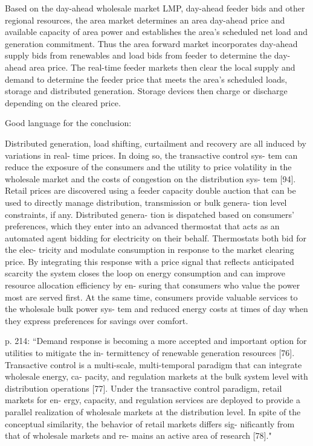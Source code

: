 Based on the day-ahead wholesale market LMP, day-ahead feeder bids and other regional resources, the area market determines an area day-ahead price and available capacity of area power and establishes the area's scheduled net load and generation commitment. Thus the area forward market incorporates day-ahead supply bids from renewables and load bids from feeder to determine the day-ahead area price. The real-time feeder markets then clear the local supply and demand to determine the feeder price that meets the area's scheduled loads, storage and distributed generation. Storage devices then charge or discharge depending on the cleared price.




Good language for the conclusion:

Distributed generation, load shifting, curtailment
and recovery are all induced by variations in real-
time prices. In doing so, the transactive control sys-
tem can reduce the exposure of the consumers and
the utility to price volatility in the wholesale market
and the costs of congestion on the distribution sys-
tem [94]. Retail prices are discovered using a feeder
capacity double auction that can be used to directly
manage distribution, transmission or bulk genera-
tion level constraints, if any. Distributed genera-
tion is dispatched based on consumers' preferences,
which they enter into an advanced thermostat that
acts as an automated agent bidding for electricity
on their behalf. Thermostats both bid for the elec-
tricity and modulate consumption in response to the
market clearing price. By integrating this response
with a price signal that reflects anticipated scarcity
the system closes the loop on energy consumption
and can improve resource allocation efficiency by en-
suring that consumers who value the power most are
served first. At the same time, consumers provide
valuable services to the wholesale bulk power sys-
tem and reduced energy costs at times of day when
they express preferences for savings over comfort.

p. 214: ``Demand response is becoming a more accepted
and important option for utilities to mitigate the in-
termittency of renewable generation resources [76].
Transactive control is a multi-scale, multi-temporal
paradigm that can integrate wholesale energy, ca-
pacity, and regulation markets at the bulk system
level with distribution operations [77]. Under the
transactive control paradigm, retail markets for en-
ergy, capacity, and regulation services are deployed
to provide a parallel realization of wholesale markets
at the distribution level. In spite of the conceptual
similarity, the behavior of retail markets differs sig-
nificantly from that of wholesale markets and re-
mains an active area of research [78]."

